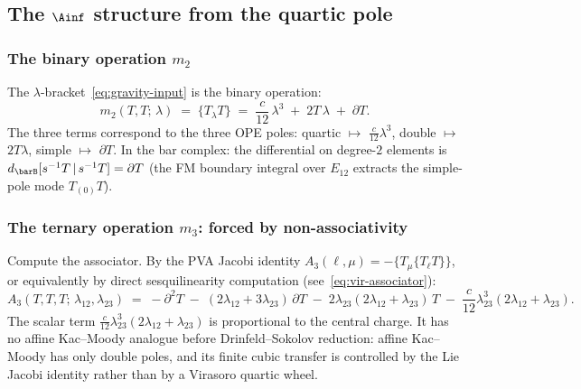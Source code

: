 \subsection{The $\Ainf$ structure from the quartic pole}
\label{subsec:gravity-ainf}

\subsubsection*{The binary operation $m_2$}

The $\lambda$-bracket~\eqref{eq:gravity-input} is the binary
operation:
\begin{equation}\label{eq:gravity-m2}
m_2(T, T;\, \lambda)
\;=\;
\{T{}_\lambda T\}
\;=\;
\frac{c}{12}\,\lambda^3
\;+\; 2T\,\lambda
\;+\; \partial T.
\end{equation}
The three terms correspond to the three OPE poles:
quartic $\mapsto$ $\frac{c}{12}\lambda^3$,
double $\mapsto$ $2T\lambda$,
simple $\mapsto$ $\partial T$.
In the bar complex: the differential on degree-$2$ elements is
$d_{\barB}[s^{-1}T \,|\, s^{-1}T] = \partial T$ (the FM boundary
integral over $E_{12}$ extracts the simple-pole mode $T_{(0)}T$).

\subsubsection*{The ternary operation $m_3$: forced by non-associativity}

Compute the associator. By the PVA Jacobi identity
$A_3(\ell,\mu) = -\{T_\mu\{T_\ell T\}\}$, or
equivalently by direct sesquilinearity computation
(see~\eqref{eq:vir-associator}):
\begin{equation}\label{eq:gravity-associator}
\boxed{
A_3(T,T,T;\,\lambda_{12},\lambda_{23})
\;=\;
-\partial^2 T
\;-\; (2\lambda_{12} + 3\lambda_{23})\,\partial T
\;-\; 2\lambda_{23}(2\lambda_{12} + \lambda_{23})\,T
\;-\; \frac{c}{12}\lambda_{23}^3(2\lambda_{12} + \lambda_{23}).}
\end{equation}
The scalar term $\tfrac{c}{12}\lambda_{23}^3(2\lambda_{12}+\lambda_{23})$
is proportional to the central charge. It has no affine
Kac--Moody analogue before Drinfeld--Sokolov reduction: affine
Kac--Moody has only double poles, and its finite cubic transfer is
controlled by the Lie Jacobi identity rather than by a Virasoro
quartic wheel.

